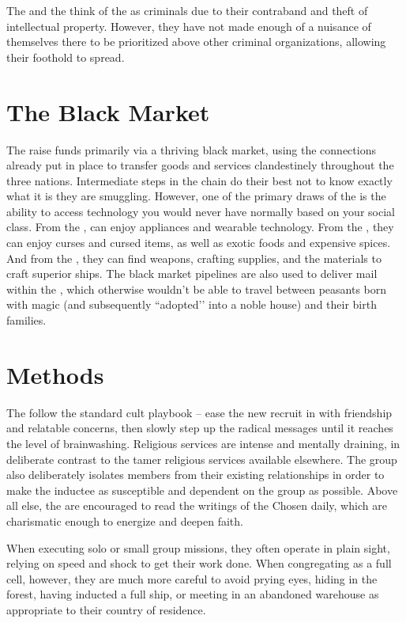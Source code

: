 \documentclass[blue]{GL2020}
\begin{document}
The \pTech{} and the \pFarm{} think of the \pGoaties{} as criminals due to their contraband and theft of intellectual property. However, they have not made enough of a nuisance of themselves there to be prioritized above other criminal organizations, allowing their foothold to spread.

\section*{The Black Market}
The \pGoaties{} raise funds primarily via a thriving black market, using the connections already put in place to transfer goods and services clandestinely throughout the three nations. Intermediate steps in the chain do their best not to know exactly what it is they are smuggling. However, one of the primary draws of the \pGoaties{} is the ability to access technology you would never have normally based on your social class. From the \pTech{}, \pGoaties{} can enjoy appliances and wearable technology. From the \pFarm{}, they can enjoy curses and cursed items, as well as exotic foods and expensive spices. And from the \pShip{}, they can find weapons, crafting supplies, and the materials to craft superior ships. The black market pipelines are also used to deliver mail within the \pFarm{}, which otherwise wouldn't be able to travel between peasants born with magic (and subsequently ``adopted'’ into a noble house) and their birth families.

\section*{Methods}
The \pGoaties{} follow the standard cult playbook -- ease the new recruit in with friendship and relatable concerns, then slowly step up the radical messages until it reaches the level of brainwashing. Religious services are intense and mentally draining, in deliberate contrast to the tamer religious services available elsewhere. The group also deliberately isolates members from their existing relationships in order to make the inductee as susceptible and dependent on the group as possible. Above all else, the \pGoaties{} are encouraged to read the writings of the Chosen daily, which are charismatic enough to energize and deepen faith.

When executing solo or small group missions, they often operate in plain sight, relying on speed and shock to get their work done. When congregating as a full cell, however, they are much more careful to avoid prying eyes, hiding in the forest, having inducted a full ship, or meeting in an abandoned warehouse as appropriate to their country of residence.
\end{document}

